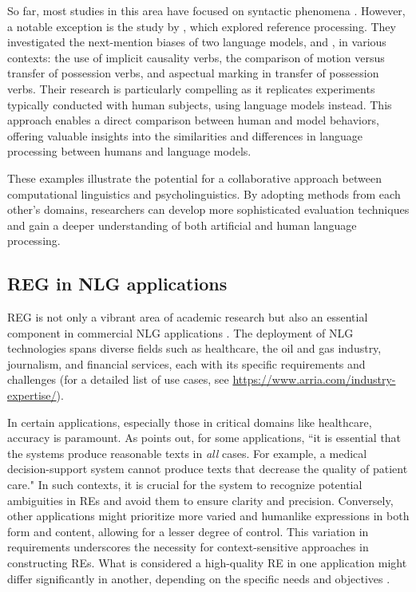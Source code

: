 So far, most studies in this area have focused on syntactic phenomena \citep{linzen2016assessing,futrell-etal-2019-neural,hewitt-manning-2019-structural}. However, a notable exception is the study by \citet{upadhye-etal-2020-predicting}, which explored reference processing. They investigated the next-mention biases of two language models,  and , in various contexts: the use of implicit causality verbs, the comparison of motion versus transfer of possession verbs, and aspectual marking in transfer of possession verbs. Their research is particularly compelling as it replicates experiments typically conducted with human subjects, using language models instead. This approach enables a direct comparison between human and model behaviors, offering valuable insights into the similarities and differences in language processing between humans and language models.

These examples illustrate the potential for a collaborative approach between computational linguistics and psycholinguistics. By adopting methods from each other’s domains, researchers can develop more sophisticated evaluation techniques and gain a deeper understanding of both artificial and human language processing.


\subsection{REG in NLG applications} 
REG is not only a vibrant area of academic research but also an essential component in commercial NLG applications \citep{reiter2016method,reiter-2017-commercial}. The deployment of NLG technologies spans diverse fields such as healthcare, the oil and gas industry, journalism, and financial services, each with its specific requirements and challenges (for a detailed list of use cases, see \url{https://www.arria.com/industry-expertise/}).

In certain applications, especially those in critical domains like healthcare, accuracy is paramount. As \citet{reiter2016commercial} points out, for some applications, ``it is essential that the systems produce reasonable texts in \emph{all} cases. For example, a medical decision-support system cannot produce texts that decrease the quality of patient care." In such contexts, it is crucial for the system to recognize potential ambiguities in REs and avoid them to ensure clarity and precision. Conversely, other applications might prioritize more varied and humanlike expressions in both form and content, allowing for a lesser degree of control. This variation in requirements underscores the necessity for context-sensitive approaches in constructing REs. What is considered a high-quality RE in one application might differ significantly in another, depending on the specific needs and objectives \citep{reiter-2017-commercial}.

